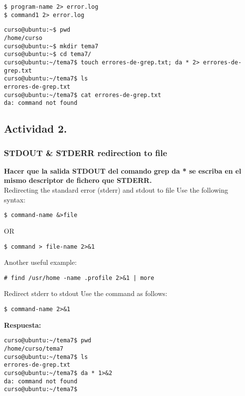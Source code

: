 \documentclass[a4paper,11pt,spanish]{article} %
\newenvironment{myscriptlisting}
{\begin{list}{}{\setlength{\leftmargin}{1em}}\item\scriptsize\bfseries}
{\end{list}}
\begin{document}
\begin{verbatim}
$ program-name 2> error.log
$ command1 2> error.log
\end{verbatim}

\begin{myscriptlisting}
  \begin{verbatim}
curso@ubuntu:~$ pwd
/home/curso
curso@ubuntu:~$ mkdir tema7
curso@ubuntu:~$ cd tema7/
curso@ubuntu:~/tema7$ touch errores-de-grep.txt; da * 2> errores-de-grep.txt
curso@ubuntu:~/tema7$ ls
errores-de-grep.txt   
curso@ubuntu:~/tema7$ cat errores-de-grep.txt 
da: command not found
  \end{verbatim}
\end{myscriptlisting}

\subsection{Actividad 2.}

\subsubsection{STDOUT \& STDERR redirection to file}

\textbf{Hacer que la salida STDOUT del comando grep da * se escriba en el mismo descriptor de fichero que STDERR.}\\

Redirecting the standard error (stderr) and stdout to file
Use the following syntax:
\begin{verbatim}
$ command-name &>file 
\end{verbatim}

OR

\begin{verbatim}
$ command > file-name 2>&1 
\end{verbatim}

Another useful example:
\begin{verbatim}
# find /usr/home -name .profile 2>&1 | more 
\end{verbatim}

Redirect stderr to stdout
Use the command as follows:

\begin{verbatim}
$ command-name 2>&1 
\end{verbatim}

\textbf{Respuesta:}

\begin{myscriptlisting}
\begin{verbatim}
curso@ubuntu:~/tema7$ pwd
/home/curso/tema7
curso@ubuntu:~/tema7$ ls
errores-de-grep.txt
curso@ubuntu:~/tema7$ da * 1>&2
da: command not found
curso@ubuntu:~/tema7$ 
\end{verbatim}
\end{myscriptlisting}
\end{document}
